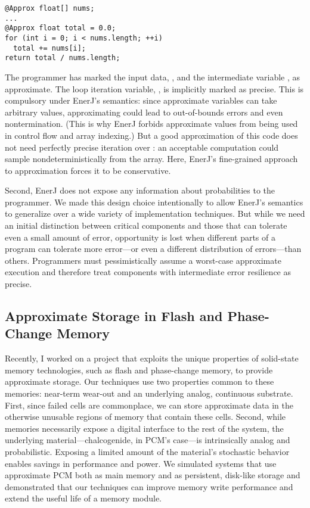 \begin{lstlisting}
@Approx float[] nums;
...
@Approx float total = 0.0;
for (int i = 0; i < nums.length; ++i)
  total += nums[i];
return total / nums.length;
\end{lstlisting}

The programmer has marked the input data, , and the intermediate
variable , as approximate.
The loop iteration variable, , is implicitly marked as precise. This
is compulsory under EnerJ's semantics: since approximate variables can take
arbitrary values, approximating  could lead to out-of-bounds errors
and even nontermination. (This is why EnerJ forbids approximate values from
being used in control flow and array indexing.) But a good approximation
of this code does not need perfectly precise iteration over : an
acceptable computation could sample nondeterministically from the array.
Here, EnerJ's fine-grained approach to approximation forces it to be
conservative.

Second, EnerJ does not expose any information about probabilities to the
programmer. We made this design choice intentionally to allow EnerJ's
semantics to generalize over a wide variety of implementation techniques. But
while we need an initial distinction between critical components and those
that can tolerate even a small amount of error, opportunity is lost when
different parts of a program can tolerate more error---or even a different
distribution of errors---than others. Programmers must pessimistically
assume a worst-case approximate execution and therefore treat components with
intermediate error resilience as precise.

\subsection{Approximate Storage in Flash and Phase-Change Memory}

Recently, I worked on a project that exploits the unique properties of
solid-state memory technologies, such as flash and phase-change memory,
to provide approximate storage. Our techniques use two properties common to these memories:
near-term wear-out and an underlying analog, continuous substrate. First, since
failed cells are commonplace, we can store approximate data in the otherwise
unusable regions of memory that contain these cells. Second, while memories
necessarily expose a digital interface to the rest of the system, the
underlying material---chalcogenide, in PCM's case---is intrinsically analog
and probabilistic. Exposing a limited amount of the material's stochastic
behavior enables savings in performance and power.
We simulated systems that use approximate PCM both as main memory and as
persistent, disk-like storage and demonstrated that our techniques can improve
memory write performance and extend the useful life of a memory module.

